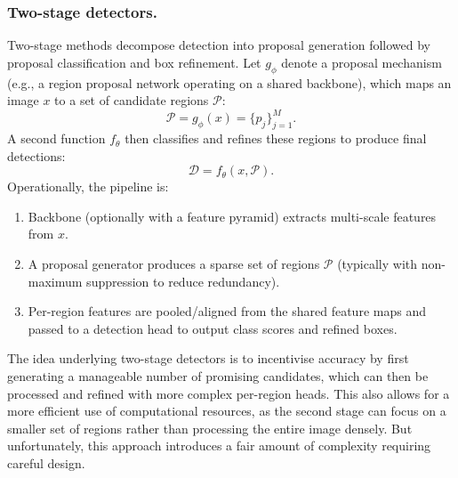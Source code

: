 \subsubsection{Two-stage detectors.}
Two-stage methods decompose detection into proposal generation followed by proposal classification and box refinement. Let $g_{\phi}$ denote a proposal mechanism (e.g., a region proposal network operating on a shared backbone), which maps an image $x$ to a set of candidate regions $\mathcal{P}$:
$$
\mathcal{P} = g_{\phi}(x) = \{p_j\}_{j=1}^{M}.
$$
A second function $f_{\theta}$ then classifies and refines these regions to produce final detections:
$$
\mathcal{D} = f_{\theta}(x, \mathcal{P}).
$$
Operationally, the pipeline is:
\begin{enumerate}
    \item Backbone (optionally with a feature pyramid) extracts multi-scale features from $x$.
    \item A proposal generator produces a sparse set of regions $\mathcal{P}$ (typically with non-maximum suppression to reduce redundancy).
    \item Per-region features are pooled/aligned from the shared feature maps and passed to a detection head to output class scores and refined boxes.
\end{enumerate}

The idea underlying two-stage detectors is to incentivise accuracy by first generating a manageable number of promising candidates, which can then be processed and refined with more complex per-region heads. This also allows for a more efficient use of computational resources, as the second stage can focus on a smaller set of regions rather than processing the entire image densely.
But unfortunately, this approach introduces a fair amount of complexity requiring careful design.

